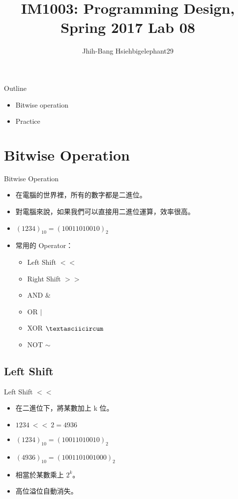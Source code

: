 \documentclass[t]{beamer}
\title{IM1003: Programming Design, Spring 2017  \linebreak Lab 08}
\author[bigelephant29]{Jhih-Bang Hsieh\linebreak \small{bigelephant29}}
\institute{\textbf{National Taiwan University}}
\date{}
\begin{document}
\begin{frame}
  \maketitle
\end{frame}

\begin{frame}{Outline}
  \begin{itemize}
    \item Bitwise operation
    \item Practice
  \end{itemize}
\end{frame}

\section{Bitwise Operation}
\begin{frame}{Bitwise Operation}
  \begin{itemize}
    \item 在電腦的世界裡，所有的數字都是二進位。
    \item 對電腦來說，如果我們可以直接用二進位運算，效率很高。
    \item $(1234)_{10} = (10011010010)_{2}$
    \item 常用的 Operator：
      \begin{itemize}
        \item Left Shift $<<$
        \item Right Shift $>>$
        \item AND $\&$
        \item OR $|$
        \item XOR $\textasciicircum$
        \item NOT $\sim$
      \end{itemize}
  \end{itemize}
\end{frame}

\subsection{Left Shift}
\begin{frame}{Left Shift $<<$}
  \begin{itemize}
    \item 在二進位下，將某數加上 k 位。
    \item $1234\ <<\ 2 = 4936$
    \item $(1234)_{10} = (10011010010)_{2}$
    \item $(4936)_{10} = (1001101001000)_{2}$
    \item 相當於某數乘上 $2^{k}$。
    \item 高位溢位自動消失。
  \end{itemize}
\end{frame}
\end{document}
